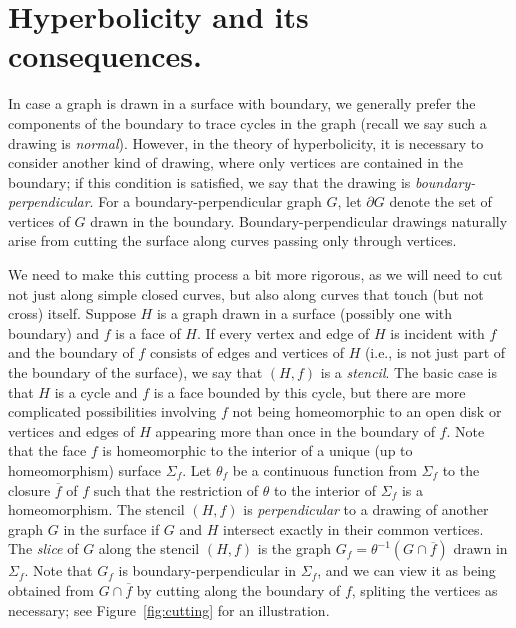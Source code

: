 \documentclass[12pt,twoside,openright,a4paper]{book}
\begin{document}
\section{Hyperbolicity and its consequences.}

In case a graph is drawn in a surface with boundary, we generally prefer the components of the boundary to trace
cycles in the graph (recall we say such a drawing is \emph{normal}).  However, in the theory of hyperbolicity, it is necessary to
consider another kind of drawing, where only vertices are contained in the boundary; if this condition is satisfied,
we say that the drawing is \emph{boundary-perpendicular}.  For a boundary-perpendicular graph $G$, let $\partial G$
denote the set of vertices of $G$ drawn in the boundary.  Boundary-perpendicular drawings naturally arise from cutting
the surface along curves passing only through vertices.

We need to make this cutting process a bit more rigorous, as we will need to cut not just along simple closed curves,
but also along curves that touch (but not cross) itself.  Suppose $H$ is a graph drawn in a surface (possibly one with boundary)
and $f$ is a face of $H$.  If every vertex and edge of $H$ is incident with $f$ and the boundary of $f$ consists of edges and vertices
of $H$ (i.e., is not just part of the boundary of the surface), we say that $(H,f)$ is a \emph{stencil}.
The basic case is that $H$ is a cycle and $f$ is a face bounded by this cycle, but there are more complicated possibilities
involving $f$ not being homeomorphic to an open disk or vertices and edges of $H$ appearing more than once in the boundary of $f$.
Note that the face $f$ is homeomorphic to the interior of a unique (up to homeomorphism) surface $\Sigma_f$.
Let $\theta_f$ be a continuous function from $\Sigma_f$ to the closure $\overline{f}$ of $f$ such that the restriction of $\theta$ to the interior
of $\Sigma_f$ is a homeomorphism.
The stencil $(H,f)$ is \emph{perpendicular} to a drawing of another graph $G$ in the surface if $G$ and $H$ intersect exactly
in their common vertices.  The \emph{slice} of $G$ along the stencil $(H,f)$ is the graph $G_f=\theta^{-1}(G\cap \overline{f})$
drawn in $\Sigma_f$.  Note that $G_f$ is boundary-perpendicular in $\Sigma_f$, and we can view it as being obtained from
$G\cap \overline{f}$ by cutting along the boundary of $f$, spliting the vertices as necessary; see Figure~\ref{fig:cutting}
for an illustration.
\end{document}
